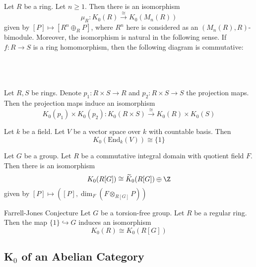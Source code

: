 \documentclass[a4paper]{article}
\begin{document}
\begin{thm}{}{} Let $R$ be a ring. Let $n\geq 1$. Then there is an isomorphism $$\mu_R:K_0(R)\overset{\cong}{\longrightarrow}K_0(M_n(R))$$ given by $[P]\mapsto[R^n\oplus_RP]$, where $R^n$ here is considered as an $(M_n(R),R)$-bimodule. Moreover, the isomorphism is natural in the following sense. If $f:R\to S$ is a ring homomorphism, then the following diagram is commutative: \\~\\
\\~\\
\end{thm}

\begin{prp}{}{} Let $R,S$ be rings. Denote $p_1:R\times S\to R$ and $p_2:R\times S\to S$ the projection maps. Then the projection maps induce an isomorphism $$K_0(p_1)\times K_0(p_2):K_0(R\times S)\overset{\cong}{\longrightarrow}K_0(R)\times K_0(S)$$
\end{prp}

\begin{prp}{}{} Let $k$ be a field. Let $V$ be a vector space over $k$ with countable basis. Then $$K_0(\text{End}_k(V))\cong\{1\}$$
\end{prp}

\begin{lmm}{}{} Let $G$ be a group. Let $R$ be a commutative integral domain with quotient field $F$. Then there is an isomorphism $$K_0(R[G])\cong\widetilde{K}_0(R[G])\oplus\Z$$ given by $[P]\mapsto([P],\dim_F(F\otimes_{R[G]}P))$
\end{lmm}

\begin{cjt}{Farrell-Jones Conjecture}{} Let $G$ be a torsion-free group. Let $R$ be a regular ring. Then the map $\{1\}\hookrightarrow G$ induces an isomorphism $$K_0(R)\cong K_0(R[G])$$
\end{cjt}

\subsection{K${_0}$ of an Abelian Category}
\end{document}
